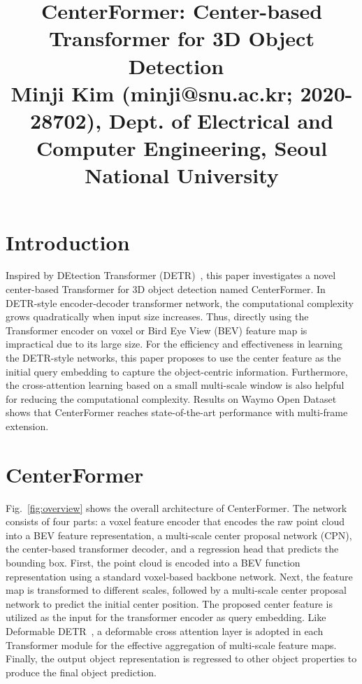 \documentclass[10pt,twocolumn,letterpaper]{article}
\begin{document}
\title{CenterFormer: Center-based Transformer for 3D Object Detection~\cite{centerformer} \\ {\rm {\normalsize Minji Kim (minji@snu.ac.kr; 2020-28702), Dept. of Electrical and Computer Engineering, Seoul National University}}}   %

\maketitle
\thispagestyle{empty}


\section{Introduction}
Inspired by DEtection Transformer (DETR)~\cite{detr}, this paper investigates a novel center-based Transformer for 3D object detection named CenterFormer.
In DETR-style encoder-decoder transformer network, the computational complexity grows quadratically when input size increases.
Thus, directly using the Transformer encoder on voxel or Bird Eye View (BEV) feature map is impractical due to its large size.
For the efficiency and effectiveness in learning the DETR-style networks, this paper proposes to use the center feature as the initial query embedding to capture the object-centric information.
Furthermore, the cross-attention learning based on a small multi-scale window is also helpful for reducing the computational complexity.
Results on Waymo Open Dataset shows that CenterFormer reaches state-of-the-art performance with multi-frame extension.



\section{CenterFormer}

Fig.~\ref{fig:overview} shows the overall architecture of CenterFormer.
The network consists of four parts: a voxel feature encoder that encodes the raw point cloud into a BEV feature representation, a multi-scale center proposal network (CPN), the center-based transformer decoder, and a regression head that predicts the bounding box.
First, the point cloud is encoded into a BEV function representation using a standard voxel-based backbone network.
Next, the feature map is transformed to different scales, followed by a multi-scale center proposal network to predict the initial center position.
The proposed center feature is utilized as the input for the transformer encoder as query embedding.
Like Deformable DETR~\cite{deformabledetr}, a deformable cross attention layer is adopted in each Transformer module for the effective aggregation of multi-scale feature maps.
Finally, the output object representation is regressed to other object properties to produce the final object prediction.
\end{document}
